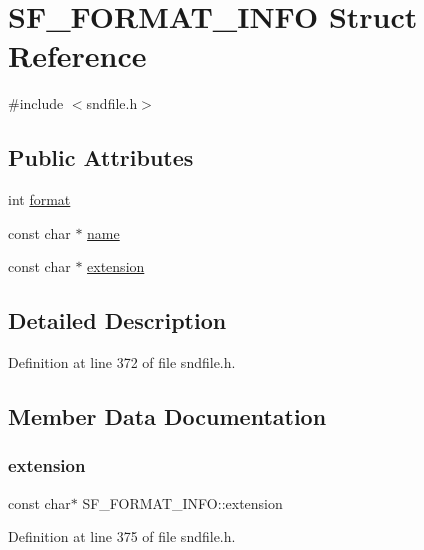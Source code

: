 \hypertarget{struct_s_f___f_o_r_m_a_t___i_n_f_o}{}\section{S\+F\+\_\+\+F\+O\+R\+M\+A\+T\+\_\+\+I\+N\+FO Struct Reference}
\label{struct_s_f___f_o_r_m_a_t___i_n_f_o}


{\ttfamily \#include $<$sndfile.\+h$>$}

\subsection*{Public Attributes}
\begin{DoxyCompactItemize}
\item 
int \mbox{\hyperlink{struct_s_f___f_o_r_m_a_t___i_n_f_o_a8d07503c07b5330c298341ca03859f66}{format}}
\item 
const char $\ast$ \mbox{\hyperlink{struct_s_f___f_o_r_m_a_t___i_n_f_o_a23129f58c26e7ce815049154d27fb408}{name}}
\item 
const char $\ast$ \mbox{\hyperlink{struct_s_f___f_o_r_m_a_t___i_n_f_o_abae4e82fb172a834a0fc3add15ec9b41}{extension}}
\end{DoxyCompactItemize}


\subsection{Detailed Description}


Definition at line 372 of file sndfile.\+h.



\subsection{Member Data Documentation}
\mbox{\label{struct_s_f___f_o_r_m_a_t___i_n_f_o_abae4e82fb172a834a0fc3add15ec9b41}} 
\subsubsection{\texorpdfstring{extension}{extension}}
{\footnotesize\ttfamily const char$\ast$ S\+F\+\_\+\+F\+O\+R\+M\+A\+T\+\_\+\+I\+N\+F\+O\+::extension}



Definition at line 375 of file sndfile.\+h.

